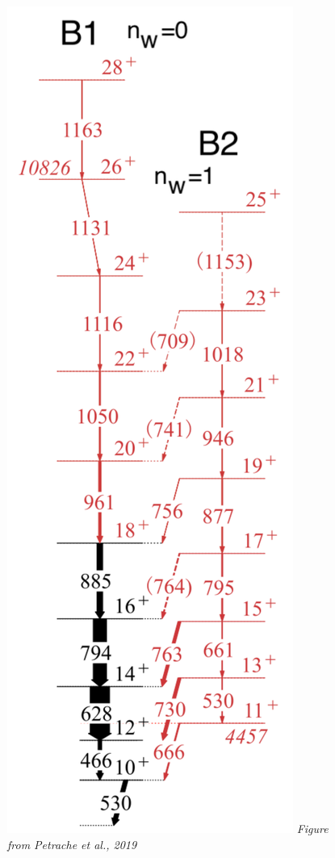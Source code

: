 \documentclass{beamer}
\begin{document}
\begin{frame}
\begin{minipage}{.2\textwidth}
\begin{figure}
      \includegraphics[scale=0.13]{Figs/ba-130-level-scheme.pdf}
      \tiny{\textit{Figure from Petrache et al., 2019}}
    \end{figure}
  \end{minipage}
\end{frame}
\end{document}
